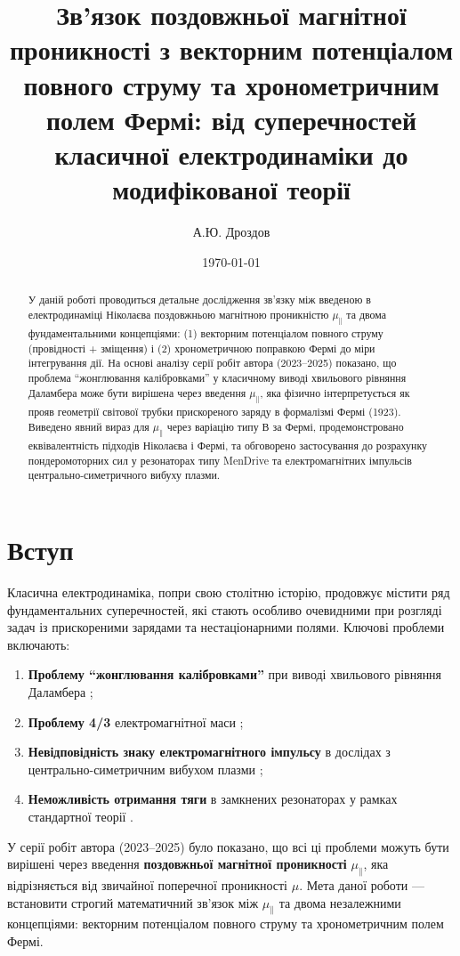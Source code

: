 \documentclass[12pt, a4paper]{article}
\title{Зв'язок поздовжньої магнітної проникності з векторним потенціалом повного струму та хронометричним полем Фермі: від суперечностей класичної електродинаміки до модифікованої теорії}
\author{А.Ю. Дроздов}
\date{\today}
\begin{document}
\maketitle

\begin{abstract}
У даній роботі проводиться детальне дослідження зв'язку між введеною в електродинаміці Ніколаєва поздовжньою магнітною проникністю $\mu_{\parallel}$ та двома фундаментальними концепціями: (1) векторним потенціалом повного струму (провідності + зміщення) і (2) хронометричною поправкою Фермі до міри інтегрування дії. На основі аналізу серії робіт автора (2023--2025) показано, що проблема ``жонглювання калібровками'' у класичному виводі хвильового рівняння Даламбера може бути вирішена через введення $\mu_{\parallel}$, яка фізично інтерпретується як прояв геометрії світової трубки прискореного заряду в формалізмі Фермі (1923). Виведено явний вираз для $\mu_{\parallel}$ через варіацію типу В за Фермі, продемонстровано еквівалентність підходів Ніколаєва і Фермі, та обговорено застосування до розрахунку пондеромоторних сил у резонаторах типу MenDrive та електромагнітних імпульсів центрально-симетричного вибуху плазми.
\end{abstract}

\section{Вступ}

Класична електродинаміка, попри свою столітню історію, продовжує містити ряд фундаментальних суперечностей, які стають особливо очевидними при розгляді задач із прискореними зарядами та нестаціонарними полями. Ключові проблеми включають:

\begin{enumerate}
    \item \textbf{Проблему ``жонглювання калібровками''} при виводі хвильового рівняння Даламбера \cite{JugglingCalibrations};
    \item \textbf{Проблему 4/3} електромагнітної маси \cite{Fermi1923};
    \item \textbf{Невідповідність знаку електромагнітного імпульсу} в дослідах з центрально-симетричним вибухом плазми \cite{PlasmaExplosion};
    \item \textbf{Неможливість отримання тяги} в замкнених резонаторах у рамках стандартної теорії \cite{MenDrive}.
\end{enumerate}

У серії робіт автора (2023--2025) було показано, що всі ці проблеми можуть бути вирішені через введення \textbf{поздовжньої магнітної проникності} $\mu_{\parallel}$, яка відрізняється від звичайної поперечної проникності $\mu$. Мета даної роботи --- встановити строгий математичний зв'язок між $\mu_{\parallel}$ та двома незалежними концепціями: векторним потенціалом повного струму та хронометричним полем Фермі.
\end{document}
